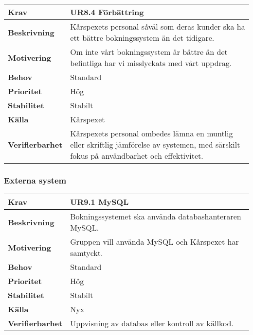 \documentclass[a4paper, twoside, 11pt, titlepage]{article}
\begin{document}
		\begin{tabular} { p{2.6cm} p{12.5cm} }
			\hline
			\sffamily\textbf{Krav} & \sffamily\textbf{UR8.4 Förbättring } \\
			\hline
			\sffamily\textbf{Beskrivning} & Kårspexets personal såväl som deras kunder ska ha ett bättre bokningssystem än det tidigare.  \\
			\hline
			\sffamily\textbf{Motivering} & Om inte vårt bokningssystem är bättre än det befintliga har vi misslyckats med vårt uppdrag.  \\
			\hline
			\sffamily\textbf{Behov} & Standard  \\
			\hline
			\sffamily\textbf{Prioritet} & Hög  \\
			\hline
			\sffamily\textbf{Stabilitet} & Stabilt  \\
			\hline
			\sffamily\textbf{Källa} & Kårspexet  \\
			\hline
			\sffamily\textbf{Verifierbarhet} & Kårspexets personal ombedes lämna en muntlig eller skriftlig jämförelse av systemen, med särskilt fokus på användbarhet och effektivitet.  \\
			\hline
		\end{tabular}


		\subsubsection{Externa system}


		\begin{tabular} { p{2.6cm} p{12.5cm} }
			\hline
			\sffamily\textbf{Krav} & \sffamily\textbf{UR9.1 MySQL } \\
			\hline
			\sffamily\textbf{Beskrivning} & Bokningssystemet ska använda databashanteraren MySQL.  \\
			\hline
			\sffamily\textbf{Motivering} & Gruppen vill använda MySQL och Kårspexet har samtyckt.  \\
			\hline
			\sffamily\textbf{Behov} & Standard  \\
			\hline
			\sffamily\textbf{Prioritet} & Hög  \\
			\hline
			\sffamily\textbf{Stabilitet} & Stabilt  \\
			\hline
			\sffamily\textbf{Källa} & Nyx  \\
			\hline
			\sffamily\textbf{Verifierbarhet} & Uppvisning av databas eller kontroll av källkod.  \\
			\hline
		\end{tabular}
		\vspace{6mm}
\end{document}
